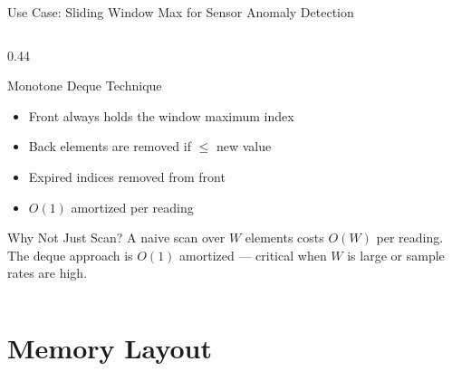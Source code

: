 \documentclass[aspectratio=169, 10pt]{beamer}
\begin{document}
\begin{frame}[fragile]{Use Case: Sliding Window Max for Sensor Anomaly Detection}
\begin{columns}[T]
\begin{column}{0.44\textwidth}
\begin{center}
\end{center}

\vspace{0.5em}
\begin{block}{Monotone Deque Technique}
\begin{itemize}
  \item Front always holds the window maximum index
  \item Back elements are removed if $\leq$ new value
  \item Expired indices removed from front
  \item $O(1)$ amortized per reading
\end{itemize}
\end{block}

\begin{alertblock}{Why Not Just Scan?}
A naive scan over $W$ elements costs $O(W)$ per reading.
The deque approach is $O(1)$ amortized --- critical
when $W$ is large or sample rates are high.
\end{alertblock}
\end{column}
\end{columns}
\end{frame}

\section{Memory Layout}
\end{document}
